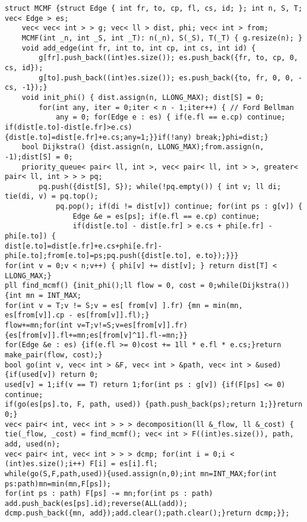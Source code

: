 \documentclass[a4paper,12pt]{article}
\begin{document}
\begin{verbatim}
struct MCMF {struct Edge { int fr, to, cp, fl, cs, id; }; int n, S, T; vec< Edge > es;
    vec< vec< int > > g; vec< ll > dist, phi; vec< int > from;
    MCMF(int _n, int _S, int _T): n(_n), S(_S), T(_T) { g.resize(n); }
    void add_edge(int fr, int to, int cp, int cs, int id) {
        g[fr].push_back((int)es.size()); es.push_back({fr, to, cp, 0, cs, id});
        g[to].push_back((int)es.size()); es.push_back({to, fr, 0, 0, -cs, -1});}
    void init_phi() { dist.assign(n, LLONG_MAX); dist[S] = 0;
        for(int any, iter = 0;iter < n - 1;iter++) { // Ford Bellman
            any = 0; for(Edge e : es) { if(e.fl == e.cp) continue;
if(dist[e.to]-dist[e.fr]>e.cs){dist[e.to]=dist[e.fr]+e.cs;any=1;}}if(!any) break;}phi=dist;}
    bool Dijkstra() {dist.assign(n, LLONG_MAX);from.assign(n, -1);dist[S] = 0;
    priority_queue< pair< ll, int >, vec< pair< ll, int > >, greater< pair< ll, int > > > pq;
        pq.push({dist[S], S}); while(!pq.empty()) { int v; ll di; tie(di, v) = pq.top();
            pq.pop(); if(di != dist[v]) continue; for(int ps : g[v]) {
                Edge &e = es[ps]; if(e.fl == e.cp) continue;
                if(dist[e.to] - dist[e.fr] > e.cs + phi[e.fr] - phi[e.to]) {
dist[e.to]=dist[e.fr]+e.cs+phi[e.fr]-phi[e.to];from[e.to]=ps;pq.push({dist[e.to], e.to});}}}
for(int v = 0;v < n;v++) { phi[v] += dist[v]; } return dist[T] < LLONG_MAX;}
pll find_mcmf() {init_phi();ll flow = 0, cost = 0;while(Dijkstra()) {int mn = INT_MAX;
for(int v = T;v != S;v = es[ from[v] ].fr) {mn = min(mn, es[from[v]].cp - es[from[v]].fl);}
flow+=mn;for(int v=T;v!=S;v=es[from[v]].fr){es[from[v]].fl+=mn;es[from[v]^1].fl-=mn;}}
for(Edge &e : es) {if(e.fl >= 0)cost += 1ll * e.fl * e.cs;}return make_pair(flow, cost);}
bool go(int v, vec< int > &F, vec< int > &path, vec< int > &used) {if(used[v]) return 0;
used[v] = 1;if(v == T) return 1;for(int ps : g[v]) {if(F[ps] <= 0) continue;
if(go(es[ps].to, F, path, used)) {path.push_back(ps);return 1;}}return 0;}
vec< pair< int, vec< int > > > decomposition(ll &_flow, ll &_cost) {
tie(_flow, _cost) = find_mcmf(); vec< int > F((int)es.size()), path, add, used(n);
vec< pair< int, vec< int > > > dcmp; for(int i = 0;i < (int)es.size();i++) F[i] = es[i].fl;
while(go(S,F,path,used)){used.assign(n,0);int mn=INT_MAX;for(int ps:path)mn=min(mn,F[ps]);
for(int ps : path) F[ps] -= mn;for(int ps : path) add.push_back(es[ps].id);reverse(ALL(add));
dcmp.push_back({mn, add});add.clear();path.clear();}return dcmp;}};
\end{verbatim}
\end{document}
